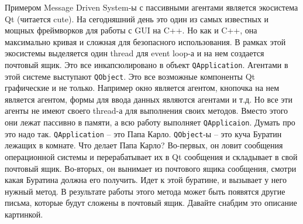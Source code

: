 Примером Message Driven System-ы с пассивными агентами является экосистема Qt (читается cute).
На сегодняшний день это один из самых известных и мощных фреймворков для работы с GUI на C++.
Но как и C++, она максимально кривая и сложная для безопасного использования.
В рамках этой экосистемы выделяется один thread для event loop-а и на нем создается почтовый ящик.
Это все инкапсюлировано в объект \verb"QApplication".
Агентами в этой системе выступают \verb"QObject".
Это все возможные компоненты Qt графические и не только.
Например окно является агентом, кнопочка на нем является агентом, формы для ввода данных являются агентами и т.д.
Но все эти агенты не имеют своего thread-а для выполнения своих методов.
Вместо этого они лежат пассивно в памяти, а всю работу выполняет \verb"QApplicaion".
Думать про это надо так.
\verb"QApplication" -- это Папа Карло.
\verb"QObject"-ы -- это куча Буратин лежащих в комнате.
Что делает Папа Карло?
Во-первых, он ловит сообщения операционной системы и перерабатывает их в Qt сообщения и складывает в свой почтовый ящик.
Во-вторых, он вынимает из почтового ящика сообщения, смотри какая Буратина должна его получить.
Идет к этой буратине, и вызывает у него нужный метод.
В результате работы этого метода может быть появятся другие письма, которые будут сложены в почтовый ящик.
Давайте снабдим это описание картинкой.
